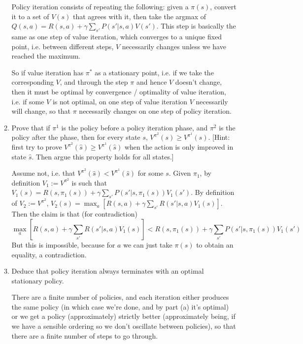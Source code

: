 \documentclass{article}
\begin{document}
\begin{enumerate}
\begin{enumerate}
  Policy iteration consists of repeating the following: given a $\pi(s)$,
  convert it to a set of $V(s)$ that agrees with it, then take the
  argmax of $Q(s,a)=R(s,a)+\gamma \sum_{s'} P(s'|s,a)V(s')$. This step
  is basically the same as one step of value iteration, which converges
  to a unique fixed point, i.e. between different steps, $V$ necessarily
  changes unless we have reached the maximum. 

  So if value iteration has $\pi^*$ as a 
  stationary point, i.e. if we take the corresponding $V$, and through 
  the step $\pi$ and hence $V$ doesn't change, then it must be optimal
  by convergence / optimality of value iteration, i.e. if some $V$ is 
  not optimal, on one step of value iteration $V$ necessarily will change,
  so that $\pi$ necessarily changes on one step of policy iteration. 

  \item {Prove that if $\pi^1$ is the policy before a policy iteration
  phase, and $\pi^2$ is the policy after the phase, then for every state $s$,
  $V^{\pi^2}(s)\geq V^{\pi^1}(s)$. [Hint: first try to prove $V^{\pi^2}(\hat s)\geq V^{\pi^1}(\hat s)$
  when the action is only improved in state $\hat s$. Then argue this property
  holds for all states.]}

  Assume not, i.e. that $V^{\pi^2}(\hat s)<V^{\pi^1}(\hat s)$ for some $s$.
  Given $\pi_1$, by definition $V_1:=V^{\pi^2}$ is such that
  $V_1(s)=R(s,\pi_1(s))+\gamma \sum_{s'}P(s'|s,\pi_1(s))V_1(s')$.
  By definition of $V_2:=V^{\pi^2}$, $V_2(s)=\max_a \left[R(s,a)+\gamma \sum_{s'}R(s'|s,a)V_1(s)\right]$.
  Then the claim is that (for contradiction)
  $$\max_a \left[R(s,a)+\gamma \sum_{s'}R(s'|s,a)V_1(s)\right] < R(s,\pi_1(s))+\gamma \sum_{s'}P(s'|s,\pi_1(s))V_1(s')$$
  But this is impossible, because for $a$ we can just take $\pi(s)$ to obtain
  an equality, a contradiction. 


  \item {Deduce that policy iteration always terminates with an
  optimal stationary policy.}
  
  There are a finite number of policies, and each iteration either produces
  the same policy (in which case we're done, and by part (a) it's optimal)
  or we get a policy (approximately) strictly better (approximately being, 
  if we have a sensible ordering so we don't oscillate between policies), so
  that there are a finite number of steps to go through. 

  \end{enumerate}


\end{enumerate}
\end{document}
